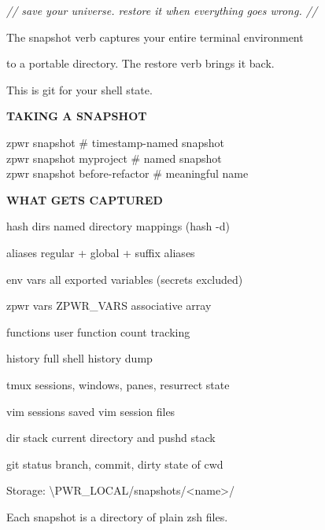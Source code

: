 \documentclass[11pt,a4paper,twoside]{book}
\begin{document}
{\small\itshape\color{dimtext} // save your universe. restore it when everything goes wrong. //}

\begin{codebox}
The snapshot verb captures your entire terminal environment\\
\end{codebox}

to a portable directory. The restore verb brings it back.

\begin{codebox}
This is git for your shell state.\\
\end{codebox}


\vspace{12pt}
{\bfseries\color{neonyellow} TAKING A SNAPSHOT}\vspace{4pt}

\begin{codebox}
zpwr snapshot                       \# timestamp-named snapshot\\
zpwr snapshot myproject              \# named snapshot\\
zpwr snapshot before-refactor        \# meaningful name\\
\end{codebox}


\vspace{12pt}
{\bfseries\color{neonyellow} WHAT GETS CAPTURED}\vspace{4pt}

hash dirs         named directory mappings (hash -d)

aliases           regular + global + suffix aliases

env vars          all exported variables (secrets excluded)

zpwr vars         ZPWR\_VARS associative array

functions         user function count tracking

history           full shell history dump

tmux             sessions, windows, panes, resurrect state

vim sessions      saved vim session files

dir stack         current directory and pushd stack

git status        branch, commit, dirty state of cwd

Storage: \textbackslash{}PWR\_LOCAL/snapshots/<name>/

Each snapshot is a directory of plain zsh files.
\end{document}
